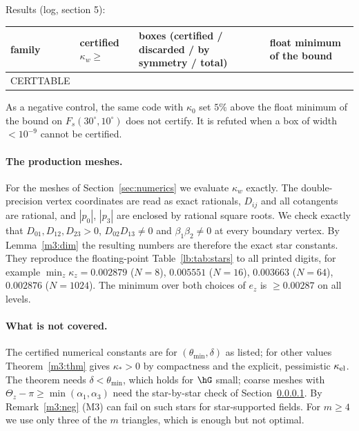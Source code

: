Results (log, section 5):
\begin{center}
\begin{tabular}{llll}
\toprule
family & certified $\kappa_w\ge$ & boxes (certified / discarded / by symmetry / total) & float minimum of the bound\\
\midrule
CERTTABLE
\bottomrule
\end{tabular}
\end{center}
As a negative control, the same code with $\kappa_0$ set $5\%$ above the float minimum of the bound on $F_s(30^\circ,10^\circ)$ does not certify. It is refuted when a box of width $<10^{-9}$ cannot be certified.

\paragraph{The production meshes.}\label{m3:sec:mesh}
For the meshes of Section~\ref{sec:numerics} we evaluate $\kappa_w$ exactly. The double-precision vertex coordinates are read as exact rationals, $D_{ij}$ and all cotangents are rational, and $|p_0|$, $|p_3|$ are enclosed by rational square roots. We check exactly that $D_{01},D_{12},D_{23}>0$, $D_{02}D_{13}\ne0$ and $\beta_1\beta_2\ne0$ at every boundary vertex. By Lemma~\ref{m3:dim} the resulting numbers are therefore the exact star constants. They reproduce the floating-point Table~\ref{lb:tab:stars} to all printed digits, for example $\min_z\kappa_z=0.002879$ ($N=8$), $0.005551$ ($N=16$), $0.003663$ ($N=64$), $0.002876$ ($N=1024$). The minimum over both choices of $e_z$ is $\ge0.00287$ on all levels.

\paragraph{What is not covered.} The certified numerical constants are for $(\theta_{\min},\delta)$ as listed; for other values Theorem~\ref{m3:thm} gives $\kappa_\ast>0$ by compactness and the explicit, pessimistic $\kappa_{\rm el}$. The theorem needs $\delta<\theta_{\min}$, which holds for $\hG$ small; coarse meshes with $\Theta_z-\pi\ge\min(\alpha_1,\alpha_3)$ need the star-by-star check of Section~\ref{m3:sec:mesh}. By Remark~\ref{m3:neg} (M3) can fail on such stars for star-supported fields. For $m\ge4$ we use only three of the $m$ triangles, which is enough but not optimal.
